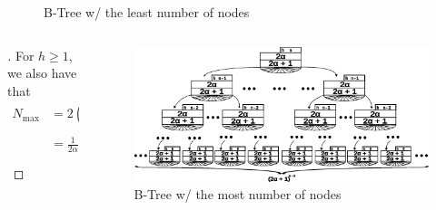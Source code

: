 \documentclass{beamer}
\begin{document}
\begin{frame}
\begin{columns}
\begin{column}{0.6\textwidth}
\begin{figure}
                \caption[]{B-Tree w/ the least number of nodes}
            \end{figure}
        \end{column}
    \end{columns}

    \framebreak

    \begin{columns}
        \begin{column}{0.4\textwidth}
            \begin{block}{}
                \begin{proof}[\unskip\nopunct]\renewcommand{\qedsymbol}{}
                    For \(h \geq 1\), we also have that
                    \[
                        \begin{aligned}
                            N_{\text{max}} &= 2\left(\sum^{h - 1}_{i = 0} \left(2\alpha + 1\right)^i \right) \\
                            &= \frac{1}{2\alpha}\left(\left(2\alpha + 1\right)^{h} - 1\right) \\
                        \end{aligned}
                    \]
                \end{proof}
            \end{block}
        \end{column}
        \begin{column}{0.6\textwidth}
            \begin{figure}
                \includegraphics[width=1\linewidth,keepaspectratio]{resources/made/generic_max_btree.eps}
                \caption[]{B-Tree w/ the most number of nodes}
            \end{figure}
        \end{column}
    \end{columns}
    \begin{columns}
        \begin{column}{\textlecolumn}

\end{column}
\end{columns}
\end{frame}
\end{document}
